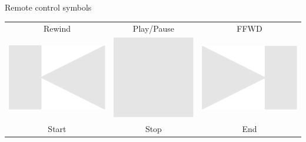 \documentclass[14pt]{beamer}
\begin{document}
\begin{frame}{Remote control symbols}
\begin{center}
\begin{tabular}{ccc}
                 Rewind \quad&\quad Play/Pause \quad&\quad FFWD \\[2.5ex]
                      \includegraphics[scale=0.2]{figures/figure026o.pdf} \quad&
                 \quad\includegraphics[scale=0.2]{figures/figure026m.pdf} \quad&
                 \quad\includegraphics[scale=0.2]{figures/figure026n.pdf} \\
                 Start \quad&\quad Stop \quad&\quad End \\[1.5ex]

\end{tabular}
\end{center}
\end{frame}
\end{document}
